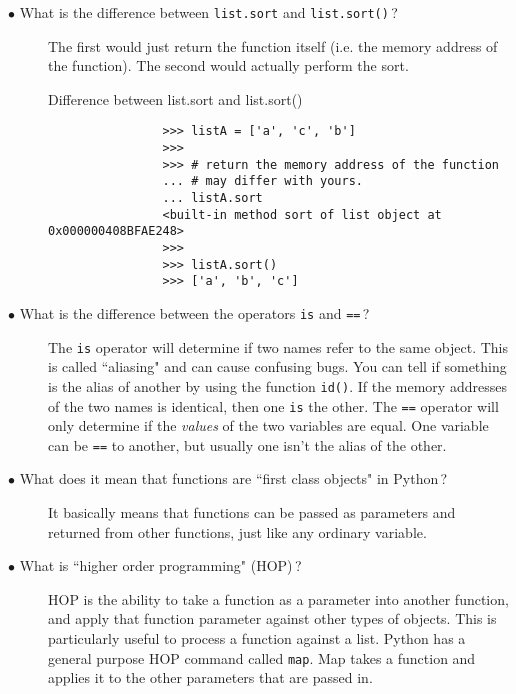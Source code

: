 \documentclass{article}
\newcommand{\inlinecode}[1]{\texttt{#1}}
\newcommand{\question}[1]{\item[$\bullet$ #1] \hfil}
\newenvironment{answer}{\newline}{}
\newenvironment{faq}{\begin{description}}{\end{description}}
\begin{document}
\begin{faq}
		\question{What is the difference between \inlinecode{list.sort} and \inlinecode{list.sort()}\,?}
		\begin{answer}
			The first would just return the function itself (i.e. the memory address of the function). The second would actually perform the sort.
			
			\begin{table}[hbp]
				\caption{Difference between list.sort and list.sort()}
				\begin{verbatim}
				>>> listA = ['a', 'c', 'b']
				>>>
				>>> # return the memory address of the function
				... # may differ with yours.
				... listA.sort
				<built-in method sort of list object at 0x000000408BFAE248>
				>>>
				>>> listA.sort()
				>>> ['a', 'b', 'c']
				\end{verbatim}
			\end{table}
		\end{answer}
		
		\question{What is the difference between the operators \inlinecode{is} and \inlinecode{==}\,?}
		\begin{answer}
			The \inlinecode{is} operator will determine if two names refer to the same object. This is called ``aliasing" and can cause confusing bugs. You can tell if something is the alias of another by using the function \inlinecode{id()}. If the memory addresses of the two names is identical, then one \inlinecode{is} the other. The \inlinecode{==} operator will only determine if the \textit{values} of the two variables are equal. One variable can be \inlinecode{==} to another, but usually one isn't the alias of the other.
		\end{answer}
		
		\question{What does it mean that functions are ``first class objects" in Python\,?}
		\begin{answer}
			It basically means that functions can be passed as parameters and returned from other functions, just like any ordinary variable.
		\end{answer}
		
		\question{What is ``higher order programming" (HOP)\,?}
		\begin{answer}
			HOP is the ability to take a function as a parameter into another function, and apply that function parameter against other types of objects.  This is particularly useful to process a function against a list. Python has a general purpose HOP command called \inlinecode{map}. Map takes a function and applies it to the other parameters that are passed in.
		\end{answer}
		

\end{faq}
\end{document}
